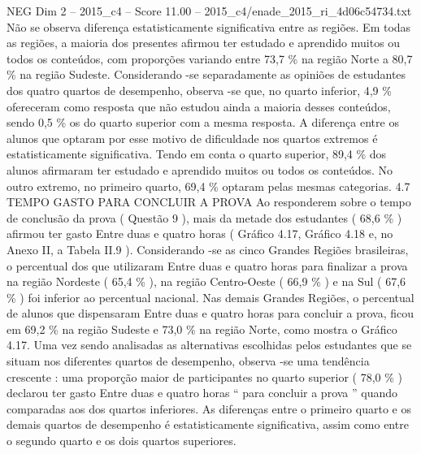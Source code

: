 \begin{textsample}{NEG Dim 2 – 2015\_c4 – Score 11.00 – 2015\_c4/enade\_2015\_ri\_4d06c54734.txt}
Não se observa diferença estatisticamente significativa entre as regiões.
Em todas as regiões, a maioria dos presentes afirmou ter estudado e aprendido muitos ou todos os conteúdos, com proporções variando entre 73,7 \% na região Norte a 80,7 \% na região Sudeste.
Considerando -se separadamente as opiniões de estudantes dos quatro quartos de desempenho, observa -se que, no quarto inferior, 4,9 \% ofereceram como resposta que não estudou ainda a maioria desses conteúdos, sendo 0,5 \% os do quarto superior com a mesma resposta.
A diferença entre os alunos que optaram por esse motivo de dificuldade nos quartos extremos é estatisticamente significativa.
Tendo em conta o quarto superior, 89,4 \% dos alunos afirmaram ter estudado e aprendido muitos ou todos os conteúdos.
No outro extremo, no primeiro quarto, 69,4 \% optaram pelas mesmas categorias. 4.7 TEMPO GASTO PARA CONCLUIR A PROVA Ao responderem sobre o tempo de conclusão da prova ( Questão 9 ), mais da metade dos estudantes ( 68,6 \% ) afirmou ter gasto Entre duas e quatro horas ( Gráfico 4.17, Gráfico 4.18 e, no Anexo II, a Tabela II.9 ).
Considerando -se as cinco Grandes Regiões brasileiras, o percentual dos que utilizaram Entre duas e quatro horas para finalizar a prova na região Nordeste ( 65,4 \% ), na região Centro-Oeste ( 66,9 \% ) e na Sul ( 67,6 \% ) foi inferior ao percentual nacional.
Nas demais Grandes Regiões, o percentual de alunos que dispensaram Entre duas e quatro horas para concluir a prova, ficou em 69,2 \% na região Sudeste e 73,0 \% na região Norte, como mostra o Gráfico 4.17.
Uma vez sendo analisadas as alternativas escolhidas pelos estudantes que se situam nos diferentes quartos de desempenho, observa -se uma tendência crescente : uma proporção maior de participantes no quarto superior ( 78,0 \% ) declarou ter gasto Entre duas e quatro horas “ para concluir a prova ” quando comparadas aos dos quartos inferiores.
As diferenças entre o primeiro quarto e os demais quartos de desempenho é estatisticamente significativa, assim como entre o segundo quarto e os dois quartos superiores.

\end{textsample}
